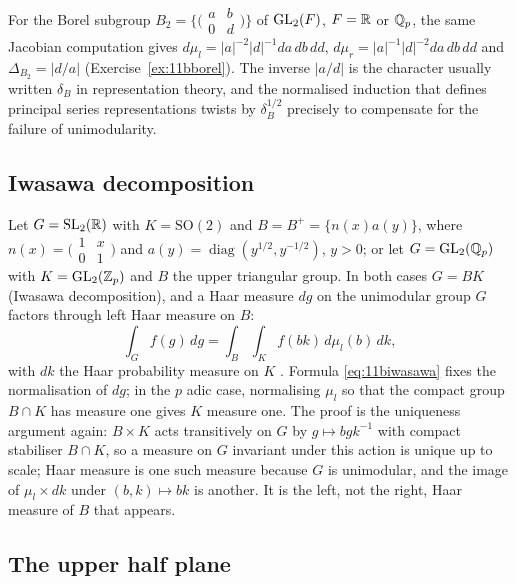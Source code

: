 For the Borel subgroup $B_2=\{\bigl(\begin{smallmatrix}a&b\\0&d\end{smallmatrix}\bigr)\}$ of $\mathrm{GL}_2(F)$, $F=\mathbb{R}$ or $\mathbb{Q}_p$, the same Jacobian computation gives $d\mu_l=|a|^{-2}|d|^{-1}da\,db\,dd$, $d\mu_r=|a|^{-1}|d|^{-2}da\,db\,dd$ and $\Delta_{B_2}=|d/a|$ (Exercise~\ref{ex:11bborel}). The inverse $|a/d|$ is the character usually written $\delta_B$ in representation theory, and the normalised induction that defines principal series representations twists by $\delta_B^{1/2}$ precisely to compensate for the failure of unimodularity.

\subsection{Iwasawa decomposition}

Let $G=\mathrm{SL}_2(\mathbb{R})$ with $K=\mathrm{SO}(2)$ and $B=B^+=\{n(x)a(y)\}$, where $n(x)=\bigl(\begin{smallmatrix}1&x\\0&1\end{smallmatrix}\bigr)$ and $a(y)=\operatorname{diag}(y^{1/2},y^{-1/2})$, $y>0$; or let $G=\mathrm{GL}_2(\mathbb{Q}_p)$ with $K=\mathrm{GL}_2(\mathbb{Z}_p)$ and $B$ the upper triangular group. In both cases $G=BK$ (Iwasawa decomposition), and a Haar measure $dg$ on the unimodular group $G$ factors through left Haar measure on $B$:
\begin{equation}\label{eq:11biwasawa}
\int_Gf(g)\,dg=\int_B\int_Kf(bk)\,d\mu_l(b)\,dk ,
\end{equation}
with $dk$ the Haar probability measure on $K$ \cite{bump1997,folland1995}. Formula \eqref{eq:11biwasawa} fixes the normalisation of $dg$; in the $p$ adic case, normalising $\mu_l$ so that the compact group $B\cap K$ has measure one gives $K$ measure one. The proof is the uniqueness argument again: $B\times K$ acts transitively on $G$ by $g\mapsto bgk^{-1}$ with compact stabiliser $B\cap K$, so a measure on $G$ invariant under this action is unique up to scale; Haar measure is one such measure because $G$ is unimodular, and the image of $\mu_l\times dk$ under $(b,k)\mapsto bk$ is another. It is the left, not the right, Haar measure of $B$ that appears.

\subsection{The upper half plane}

